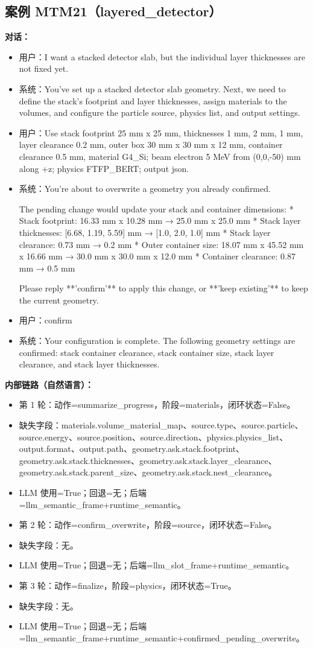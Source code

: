 \documentclass[11pt]{ctexart}
\begin{document}
\subsection{案例 MTM21（layered\_detector）}
\textbf{对话：}
\begin{itemize}
\item 用户：I want a stacked detector slab, but the individual layer thicknesses are not fixed yet.
\item 系统：You've set up a stacked detector slab geometry. Next, we need to define the stack's footprint and layer thicknesses, assign materials to the volumes, and configure the particle source, physics list, and output settings.
\item 用户：Use stack footprint 25 mm x 25 mm, thicknesses 1 mm, 2 mm, 1 mm, layer clearance 0.2 mm, outer box 30 mm x 30 mm x 12 mm, container clearance 0.5 mm, material G4\_Si; beam electron 5 MeV from (0,0,-50) mm along +z; physics FTFP\_BERT; output json.
\item 系统：You're about to overwrite a geometry you already confirmed.

The pending change would update your stack and container dimensions:
*   Stack footprint: 16.33 mm x 10.28 mm → 25.0 mm x 25.0 mm
*   Stack layer thicknesses: [6.68, 1.19, 5.59] mm → [1.0, 2.0, 1.0] mm
*   Stack layer clearance: 0.73 mm → 0.2 mm
*   Outer container size: 18.07 mm x 45.52 mm x 16.66 mm → 30.0 mm x 30.0 mm x 12.0 mm
*   Container clearance: 0.87 mm → 0.5 mm

Please reply **'confirm'** to apply this change, or **'keep existing'** to keep the current geometry.
\item 用户：confirm
\item 系统：Your configuration is complete. The following geometry settings are confirmed: stack container clearance, stack container size, stack layer clearance, and stack layer thicknesses.
\end{itemize}
\textbf{内部链路（自然语言）：}
\begin{itemize}
\item 第 1 轮：动作=summarize\_progress，阶段=materials，闭环状态=False。
\item 缺失字段：materials.volume\_material\_map、source.type、source.particle、source.energy、source.position、source.direction、physics.physics\_list、output.format、output.path、geometry.ask.stack.footprint、geometry.ask.stack.thicknesses、geometry.ask.stack.layer\_clearance、geometry.ask.stack.parent\_size、geometry.ask.stack.nest\_clearance。
\item LLM 使用=True；回退=无；后端=llm\_semantic\_frame+runtime\_semantic。
\item 第 2 轮：动作=confirm\_overwrite，阶段=source，闭环状态=False。
\item 缺失字段：无。
\item LLM 使用=True；回退=无；后端=llm\_slot\_frame+runtime\_semantic。
\item 第 3 轮：动作=finalize，阶段=physics，闭环状态=True。
\item 缺失字段：无。
\item LLM 使用=True；回退=无；后端=llm\_semantic\_frame+runtime\_semantic+confirmed\_pending\_overwrite。
\end{itemize}
\end{document}
